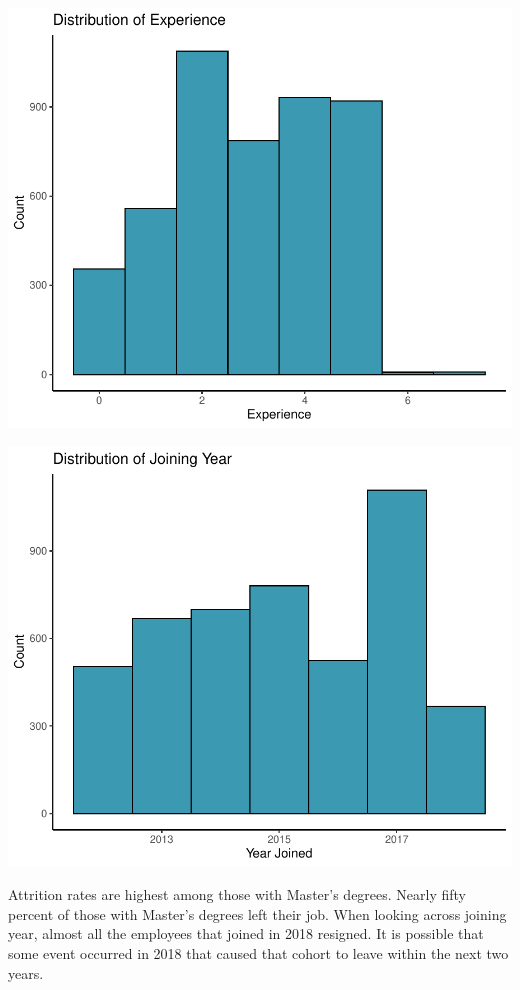 \documentclass[11pt,preprint, authoryear]{elsarticle}
\numberwithin{equation}{section}
\numberwithin{figure}{section}
\numberwithin{table}{section}
\begin{document}
\includegraphics{Final_project_files/figure-latex/unnamed-chunk-5-1.pdf}

\includegraphics{Final_project_files/figure-latex/unnamed-chunk-6-1.pdf}

Attrition rates are highest among those with Master's degrees. Nearly
fifty percent of those with Master's degrees left their job. When
looking across joining year, almost all the employees that joined in
2018 resigned. It is possible that some event occurred in 2018 that
caused that cohort to leave within the next two years.
\end{document}
